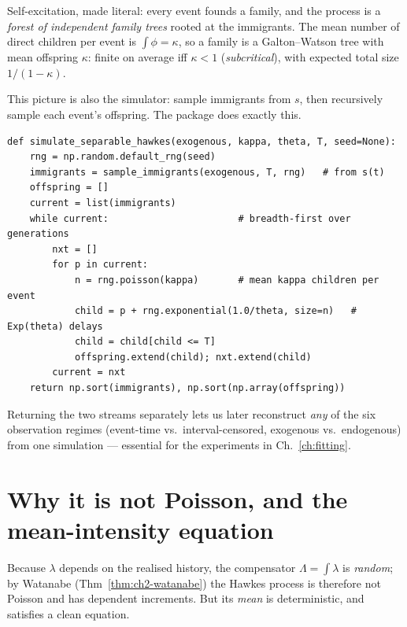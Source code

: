 \begin{intuitionbox}
Self-excitation, made literal: every event founds a family, and the process is a
\emph{forest of independent family trees} rooted at the immigrants. The mean number
of direct children per event is $\int\phi=\kappa$, so a family is a Galton--Watson
tree with mean offspring $\kappa$: finite on average iff $\kappa<1$
(\emph{subcritical}), with expected total size $1/(1-\kappa)$.
\end{intuitionbox}

This picture is also the simulator: sample immigrants from $s$, then recursively
sample each event's offspring. The package does exactly this.

\begin{lstlisting}[caption={Cluster simulation (from \code{ic\_simulate.py}).}]
def simulate_separable_hawkes(exogenous, kappa, theta, T, seed=None):
    rng = np.random.default_rng(seed)
    immigrants = sample_immigrants(exogenous, T, rng)   # from s(t)
    offspring = []
    current = list(immigrants)
    while current:                       # breadth-first over generations
        nxt = []
        for p in current:
            n = rng.poisson(kappa)       # mean kappa children per event
            child = p + rng.exponential(1.0/theta, size=n)   # Exp(theta) delays
            child = child[child <= T]
            offspring.extend(child); nxt.extend(child)
        current = nxt
    return np.sort(immigrants), np.sort(np.array(offspring))
\end{lstlisting}

\begin{whybox}
Returning the two streams separately lets us later reconstruct \emph{any} of the
six observation regimes (event-time vs.\ interval-censored, exogenous vs.\
endogenous) from one simulation --- essential for the experiments in
Ch.~\ref{ch:fitting}.
\end{whybox}

\section{Why it is not Poisson, and the mean-intensity equation}

Because $\lambda$ depends on the realised history, the compensator
$\Lambda=\int\lambda$ is \emph{random}; by Watanabe (Thm~\ref{thm:ch2-watanabe})
the Hawkes process is therefore not Poisson and has dependent increments. But its
\emph{mean} is deterministic, and satisfies a clean equation.

